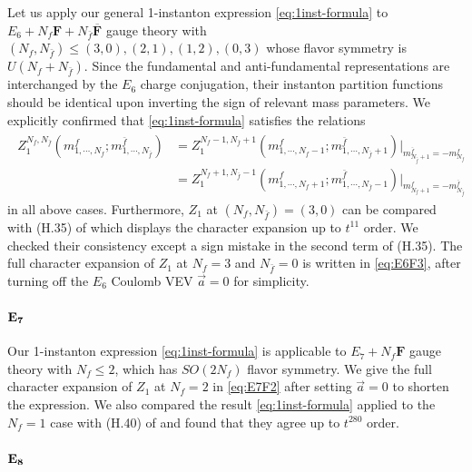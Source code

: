 \documentclass[letterpaper, 11pt]{article}
\begin{document}
{Let us apply our general 1-instanton expression \eqref{eq:1inst-formula} to $E_6 + N_f \mathbf{F} + N_{\bar{f}}\overline{\mathbf{F}}$ gauge theory with $(N_f,N_{\bar{f}}) \leq (3,0), (2,1), (1,2),(0,3)$ whose flavor symmetry is $U(N_f 
+ N_{\bar{f}})$. Since the fundamental and anti-fundamental representations are interchanged by the $E_6$ charge conjugation, their instanton partition functions should be identical upon inverting the sign of relevant mass parameters. We explicitly confirmed that \eqref{eq:1inst-formula} satisfies the relations
\begin{align}
\begin{split}
  Z_{1}^{N_f,N_{\bar{f}}}(m^f_{1, \cdots, N_f}; m^{\bar{f}}_{1,\cdots,N_{\bar{f}}}) &= Z_{1}^{N_f-1,N_{\bar{f}}+1}(m^f_{1, \cdots, N_f-1}; m^{\bar{f}}_{1,\cdots,N_{\bar{f}}+1})\big|_{m^{\bar{f}}_{N_{\bar{f}}+1} = -m^f_{N_f}}\\ 
  &= Z_{1}^{N_f+1,N_{\bar{f}}-1}(m^f_{1, \cdots, N_f+1}; m^{\bar{f}}_{1,\cdots,N_{\bar{f}}-1})\big|_{m^{f}_{N_{f}+1} = -m^{\bar{f}}_{N_{\bar{f}}}}
\end{split}
\end{align}
in all above cases. Furthermore, $Z_1$ at $(N_f, N_{\bar{f}}) = (3,0)$ can be compared with (H.35) of \cite{DelZotto:2018tcj} which displays the character expansion up to $t^{11}$ order. We checked their consistency except a sign mistake in the second term of (H.35). The full character expansion of $Z_1$ at $N_f=3$ and $N_{\bar{f}}=0$ is written in \eqref{eq:E6F3}, after turning off the $E_6$ Coulomb VEV $\vec{a} = 0$ for simplicity.


\paragraph{$\bf E_7$}

Our 1-instanton expression \eqref{eq:1inst-formula} is applicable to $E_7 + N_f\mathbf{F}$ gauge theory with $N_f \leq 2$, which has $SO(2N_f)$ flavor symmetry. We give the full character expansion of $Z_1$ at $N_f=2$ in \eqref{eq:E7F2} after setting $\vec{a}=0$ to shorten the expression. We also compared the result \eqref{eq:1inst-formula} applied to the $N_f = 1$ case with (H.40) of \cite{DelZotto:2018tcj} and found that they agree up to $t^{280}$ order.


\paragraph{$\bf E_8$}

}
\end{document}
